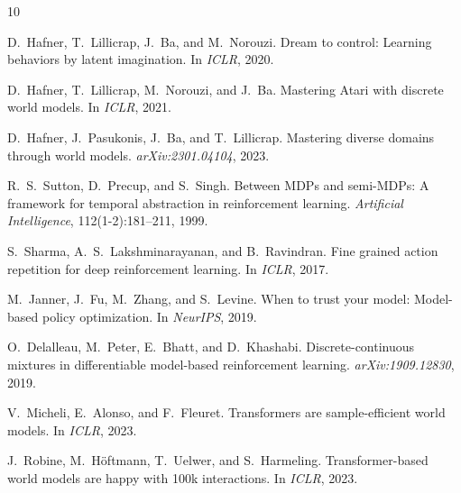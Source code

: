 \documentclass[10pt,letterpaper]{article}
\begin{document}


\begin{thebibliography}{10}

D.~Hafner, T.~Lillicrap, J.~Ba, and M.~Norouzi.
\newblock Dream to control: Learning behaviors by latent imagination.
\newblock In \emph{ICLR}, 2020.

D.~Hafner, T.~Lillicrap, M.~Norouzi, and J.~Ba.
\newblock Mastering {A}tari with discrete world models.
\newblock In \emph{ICLR}, 2021.

D.~Hafner, J.~Pasukonis, J.~Ba, and T.~Lillicrap.
\newblock Mastering diverse domains through world models.
\newblock \emph{arXiv:2301.04104}, 2023.

R.~S.~Sutton, D.~Precup, and S.~Singh.
\newblock Between {MDP}s and semi-{MDP}s: A framework for temporal abstraction in reinforcement learning.
\newblock \emph{Artificial Intelligence}, 112(1-2):181--211, 1999.

S.~Sharma, A.~S.~Lakshminarayanan, and B.~Ravindran.
\newblock Fine grained action repetition for deep reinforcement learning.
\newblock In \emph{ICLR}, 2017.

M.~Janner, J.~Fu, M.~Zhang, and S.~Levine.
\newblock When to trust your model: Model-based policy optimization.
\newblock In \emph{NeurIPS}, 2019.

O.~Delalleau, M.~Peter, E.~Bhatt, and D.~Khashabi.
\newblock Discrete-continuous mixtures in differentiable model-based reinforcement learning.
\newblock \emph{arXiv:1909.12830}, 2019.

V.~Micheli, E.~Alonso, and F.~Fleuret.
\newblock Transformers are sample-efficient world models.
\newblock In \emph{ICLR}, 2023.

J.~Robine, M.~H{\"o}ftmann, T.~Uelwer, and S.~Harmeling.
\newblock Transformer-based world models are happy with 100k interactions.
\newblock In \emph{ICLR}, 2023.

\end{thebibliography}
\end{document}
